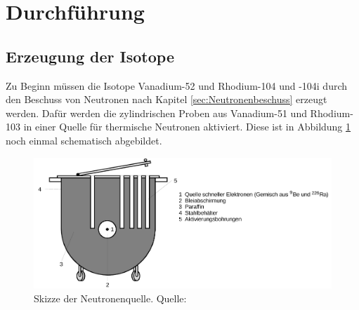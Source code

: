 \newpage
\section{Durchführung}
\label{sec:Durchführung}
\subsection{Erzeugung der Isotope}
\label{sec:Erzeugung}
Zu Beginn müssen die Isotope Vanadium-52 und Rhodium-104 und -104i durch den Beschuss von Neutronen nach
Kapitel \ref{sec:Neutronenbeschuss} erzeugt werden. Dafür werden die zylindrischen Proben aus Vanadium-51
und Rhodium-103 in einer Quelle für thermische Neutronen aktiviert. Diese ist in Abbildung 
\ref{fig:Neutronen} noch einmal schematisch abgebildet.
\begin{figure}[H]
    \centering
    \includegraphics[scale=0.4]{content/Neutronen.png}
    \caption{Skizze der Neutronenquelle. Quelle:\cite{AP01}}
    \label{fig:Neutronen}
  \end{figure}
